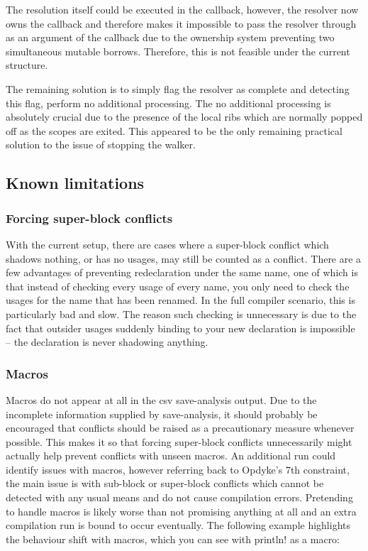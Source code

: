 The resolution itself could be executed in the callback, however, the resolver now owns the callback and therefore makes it impossible to pass the resolver through as an argument of the callback due to the ownership system preventing two simultaneous mutable borrows. Therefore, this is not feasible under the current structure.

The remaining solution is to simply flag the resolver as complete and detecting this flag, perform no additional processing. The no additional processing is absolutely crucial due to the presence of the local ribs which are normally popped off as the scopes are exited. This appeared to be the only remaining practical solution to the issue of stopping the walker.

\subsection{Known limitations}\label{S:limit}
\subsubsection{Forcing super-block conflicts}
With the current setup, there are cases where a super-block conflict which shadows nothing, or has no usages, may still be counted as a conflict. There are a few advantages of preventing redeclaration under the same name, one of which is that instead of checking every usage of every name, you only need to check the usages for the name that has been renamed. In the full compiler scenario, this is particularly bad and slow. The reason such checking is unnecessary is due to the fact that outsider usages suddenly binding to your new declaration is impossible -- the declaration is never shadowing anything.

\subsubsection{Macros}
Macros do not appear at all in the csv save-analysis output. Due to the incomplete information supplied by save-analysis, it should probably be encouraged that conflicts should be raised as a precautionary measure whenever possible. This makes it so that forcing super-block conflicts unnecessarily might actually help prevent conflicts with unseen macros. An additional run could identify issues with macros, however referring back to Opdyke's 7th constraint, the main issue is with sub-block or super-block conflicts which cannot be detected with any usual means and do not cause compilation errors. Pretending to handle macros is likely worse than not promising anything at all and an extra compilation run is bound to occur eventually. The following example highlights the behaviour shift with macros, which you can see with println! as a macro:

